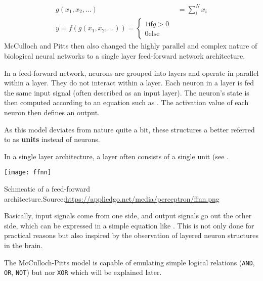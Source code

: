\begin{align}
    g(x_1, x_2, ...) & = \sum_i^N x_i \\
    y = f(g(x_1, x_2, ...)) = \begin{cases} 1 \text{if} g > 0 \\ 0 \text{else} \end{cases}
\end{align}
McCulloch and Pitts then also changed the highly parallel and complex nature of biological neural networks to a single layer feed-forward network architecture.

In a feed-forward network, neurons are grouped into layers and operate in parallel within a layer.
They do not interact within a layer.
Each neuron in a layer is fed the same input signal (often described as an input layer).
The neuron's state is then computed according to an equation such as .
The activation value of each neuron then defines an output.

As this model deviates from nature quite a bit, these structures a better referred to as \textbf{units} instead of neurons.

In a single layer architecture, a layer often consists of a single unit (see .
\begin{marginfigure}
    \texttt{[image: ffnn]}
    \caption[]{Schmeatic of a feed-forward architecture.Source:\url{https://appliedgo.net/media/perceptron/ffnn.png}}
\end{marginfigure}
Basically, input signals come from one side, and output signals go out the other side, which can be expressed in a simple equation like .
This is not only done for practical reasons but also inspired by the observation of layered neuron structures in the brain.

The McCulloch-Pitts model is capable of emulating simple logical relations (\lstinline|AND|, \lstinline|OR|, \lstinline|NOT|) but nor \lstinline|XOR| which will be explained later.

